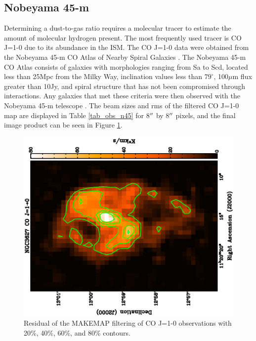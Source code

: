 
\subsection{Nobeyama 45-m}\label{nob_sec}

Determining a dust-to-gas ratio requires a molecular tracer to estimate the amount of molecular hydrogen present.  The most frequently used tracer is CO J=1-0 due to its abundance in the ISM.  The CO J=1-0 data were obtained from the Nobeyama 45-m CO Atlas of Nearby Spiral Galaxies \citep{kuno2007}.  The Nobeyama 45-m CO Atlas consists of galaxies with morphologies ranging from Sa to Scd, located less than 25Mpc from the Milky Way, inclination values less than $79^{\circ}$, 100$\mu$m flux greater than 10Jy, and spiral structure that has not been compromised through interactions.  Any galaxies that met these criteria were then observed with the Nobeyama 45-m telescope \citep{kuno2007}.  The beam sizes and rms of the filtered CO J=1-0 map are displayed in Table \ref{tab_obs_n45} for 8$\mbox{$^{\prime\prime}$}$ by 8$\mbox{$^{\prime\prime}$}$ pixels, and the final image product can be seen in Figure \ref{fig_co10}.

\begin{figure}
  \centering
  \includegraphics[width=1.\textwidth, angle=270]{obs_imgs/10_rem.eps}
  \caption[NGC3627 CO J=1-0 Observations]{Residual of the MAKEMAP filtering of CO J=1-0 observations with 20\%, 40\%, 60\%, and 80\% contours.}
  \label{fig_co10}
\end{figure}

